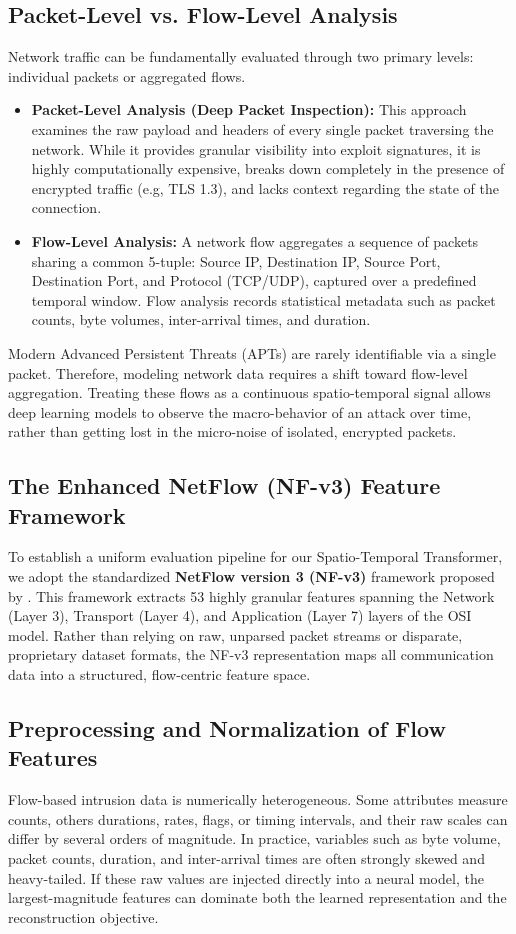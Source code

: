 \documentclass[12pt, a4paper]{report}
\begin{document}
\subsection{Packet-Level vs. Flow-Level Analysis}
Network traffic can be fundamentally evaluated through two primary levels: individual packets or aggregated flows.
\begin{itemize}
    \item \textbf{Packet-Level Analysis (Deep Packet Inspection):} This approach examines the raw payload and headers of every single packet traversing the network. While it provides granular visibility into exploit signatures, it is highly computationally expensive, breaks down completely in the presence of encrypted traffic (e.g, TLS 1.3), and lacks context regarding the state of the connection.
    \item \textbf{Flow-Level Analysis:} A network flow aggregates a sequence of packets sharing a common 5-tuple: Source IP, Destination IP, Source Port, Destination Port, and Protocol (TCP/UDP), captured over a predefined temporal window. Flow analysis records statistical metadata such as packet counts, byte volumes, inter-arrival times, and duration.
\end{itemize}
Modern Advanced Persistent Threats (APTs) are rarely identifiable via a single packet. Therefore, modeling network data requires a shift toward flow-level aggregation. Treating these flows as a continuous spatio-temporal signal allows deep learning models to observe the macro-behavior of an attack over time, rather than getting lost in the micro-noise of isolated, encrypted packets.

\subsection{The Enhanced NetFlow (NF-v3) Feature Framework}

To establish a uniform evaluation pipeline for our Spatio-Temporal Transformer, we adopt the standardized \textbf{NetFlow version 3 (NF-v3)} framework proposed by \cite{NF3-2025}. This framework extracts 53 highly granular features spanning the Network (Layer 3), Transport (Layer 4), and Application (Layer 7) layers of the OSI model. Rather than relying on raw, unparsed packet streams or disparate, proprietary dataset formats, the NF-v3 representation maps all communication data into a structured, flow-centric feature space.

\subsection{Preprocessing and Normalization of Flow Features}
Flow-based intrusion data is numerically heterogeneous. Some attributes measure counts, others durations, rates, flags, or timing intervals, and their raw scales can differ by several orders of magnitude. In practice, variables such as byte volume, packet counts, duration, and inter-arrival times are often strongly skewed and heavy-tailed. If these raw values are injected directly into a neural model, the largest-magnitude features can dominate both the learned representation and the reconstruction objective.
\end{document}
